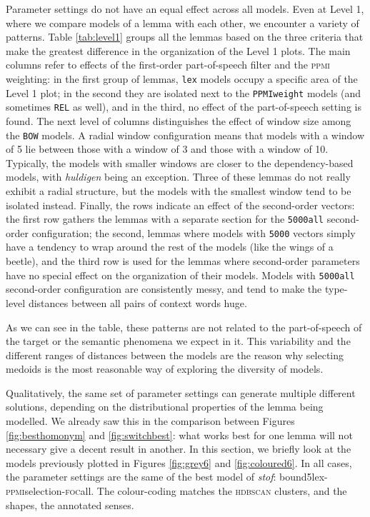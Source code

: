 \documentclass[
]{book}
\begin{document}
Parameter settings do not have an equal effect across all models. Even at Level 1, where we compare models of a lemma with each other, we encounter a variety of patterns.
Table \ref{tab:level1} groups all the lemmas based on the three criteria that make the greatest difference in the organization of the Level 1 plots. The main columns refer to effects of the first-order part-of-speech filter and the \textsc{ppmi} weighting: in the first group of lemmas, \texttt{lex} models occupy a specific area of the Level 1 plot; in the second they are isolated next to the \texttt{PPMIweight} models (and sometimes \texttt{REL} as well), and in the third, no effect of the part-of-speech setting is found. The next level of columns distinguishes the effect of window size among the \texttt{BOW} models. A radial window configuration means that models with a window of 5 lie between those with a window of 3 and those with a window of 10. Typically, the models with smaller windows are closer to the dependency-based models, with \emph{huldigen} being an exception. Three of these lemmas do not really exhibit a radial structure, but the models with the smallest window tend to be isolated instead. Finally, the rows indicate an effect of the second-order vectors: the first row gathers the lemmas with a separate section for the \texttt{5000all} second-order configuration; the second, lemmas where models with \texttt{5000} vectors simply have a tendency to wrap around the rest of the models (like the wings of a beetle), and the third row is used for the lemmas where second-order parameters have no special effect on the organization of their models. Models with \texttt{5000all} second-order configuration are consistently messy, and tend to make the type-level distances between all pairs of context words huge.

As we can see in the table, these patterns are not related to the part-of-speech of the target or the semantic phenomena we expect in it. This variability and the different ranges of distances between the models are the reason why selecting medoids is the most reasonable way of exploring the diversity of models.

Qualitatively, the same set of parameter settings can generate multiple different solutions, depending on the distributional properties of the lemma being modelled. We already saw this in the comparison between Figures \ref{fig:besthomonym} and \ref{fig:switchbest}: what works best for one lemma will not necessary give a decent result in another. In this section, we briefly look at the models previously plotted in Figures \ref{fig:grey6} and \ref{fig:coloured6}. In all cases, the parameter settings are the same of the best model of \emph{stof}:
bound5lex-\textsc{ppmi}selection-\textsc{foc}all. The colour-coding matches the \textsc{hdbscan} clusters, and the shapes, the annotated senses.
\end{document}
